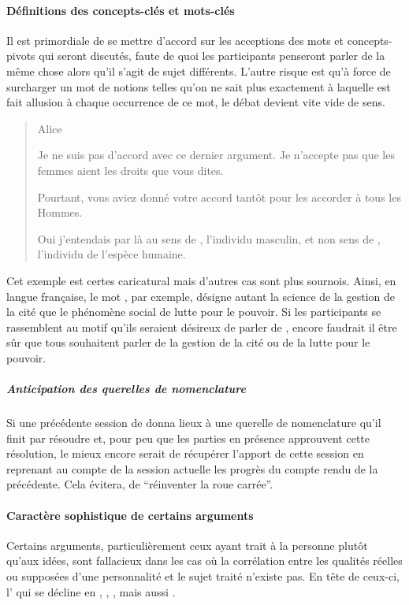 \paragraph{Définitions des concepts-clés et mots-clés}
Il est primordiale de se mettre d’accord sur les acceptions des mots et concepts-pivots qui seront discutés, faute de quoi les participants penseront parler de la même chose alors qu’il s’agit de sujet différents. L’autre risque est qu’à force de surcharger un mot de notions telles qu’on ne sait plus exactement à laquelle est fait allusion à chaque occurrence de ce mot, le débat devient vite vide de sens.

\begin{quote}
  \begin{drama}{0cm}{0cm}{Alice}

    \Aspeaks Je ne suis pas d’accord avec ce dernier argument. Je n’accepte pas que les femmes aient les droits que vous dites.

    \Bspeaks Pourtant, vous aviez donné votre accord tantôt pour les accorder à tous les Hommes.

    \Aspeaks Oui j’entendais par là  au sens de , l’individu masculin, et non  sens de , l’individu de l’espèce humaine.

  \end{drama}
\end{quote}

Cet exemple est certes caricatural mais d’autres cas sont plus sournois. Ainsi, en langue française, le mot , par exemple, désigne autant la science de la gestion de la cité que le phénomène social de lutte pour le pouvoir. Si les participants se rassemblent au motif qu’ils seraient désireux de parler de , encore faudrait il être sûr que tous souhaitent parler de la gestion de la cité ou de la lutte pour le pouvoir.

\subparagraph{Anticipation des querelles de nomenclature}
Si une précédente session de \mainabbr{} donna lieux à une querelle de nomenclature qu’il finit par résoudre et, pour peu que les parties en présence approuvent cette résolution, le mieux encore serait de récupérer l’apport de cette session en reprenant au compte de la session actuelle les progrès du compte rendu de la précédente. Cela évitera, de \enquote{réinventer la roue carrée}.

\paragraph{Caractère sophistique de certains arguments}
Certains arguments, particulièrement ceux ayant trait à la personne plutôt qu’aux idées, sont fallacieux dans les cas où la corrélation entre les qualités réelles ou supposées d’une personnalité et le sujet traité n’existe pas. En tête de ceux-ci, l’ qui se décline en , , , mais aussi .

